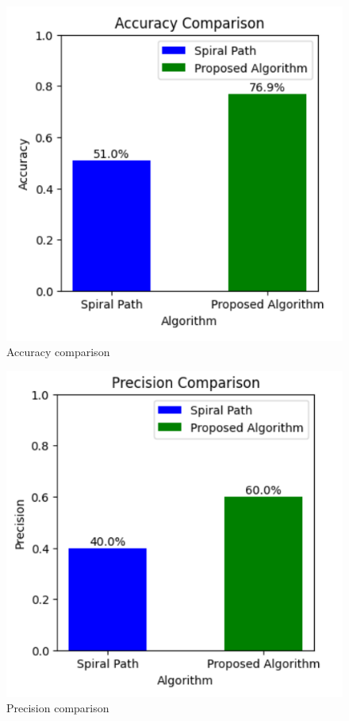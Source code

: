 \documentclass[conference]{IEEEtran}
\begin{document}
\begin{figure}[htp]
    \centering
    \includegraphics[scale=0.7]{plot15.png}
    \caption{Accuracy comparison}
    \label{dac}
\end{figure}
\begin{figure}[htp]
    \centering
    \includegraphics[scale=0.7]{plot16.png}
    \caption{Precision comparison}
    \label{dpr}
\end{figure}
\end{document}
